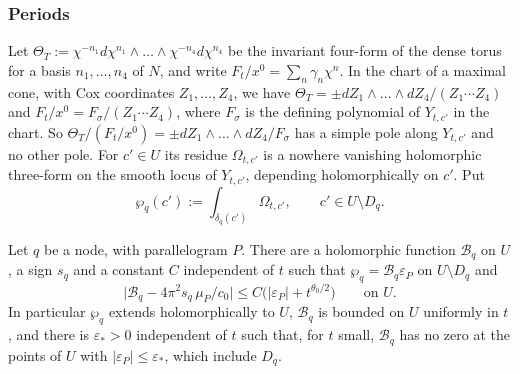 \subsubsection*{Periods}
Let $\Theta_T:=\chi^{-n_1}d\chi^{n_1}\wedge\dots\wedge\chi^{-n_4}d\chi^{n_4}$ be the invariant four-form of the dense
torus for a basis $n_1,\dots,n_4$ of $N$, and write $F_t/x^0=\sum_n\gamma_n\chi^n$. In the chart of a maximal cone, with
Cox coordinates $Z_1,\dots,Z_4$, we have $\Theta_T=\pm dZ_1\wedge\dots\wedge dZ_4/(Z_1\cdots Z_4)$ and
$F_t/x^0=F_\sigma/(Z_1\cdots Z_4)$, where $F_\sigma$ is the defining polynomial of $Y_{t,c'}$ in the chart. So
$\Theta_T/(F_t/x^0)=\pm dZ_1\wedge\dots\wedge dZ_4/F_\sigma$ has a simple pole along $Y_{t,c'}$ and no other pole. For
$c'\in U$ its residue $\Omega_{t,c'}$ is a nowhere vanishing holomorphic three-form on the smooth locus of $Y_{t,c'}$,
depending holomorphically on $c'$. Put
\[
\wp_q(c'):=\int_{\delta_q(c')}\Omega_{t,c'},\qquad c'\in U\setminus D_q .
\]

\begin{lemma}[periods]\label{lem:period}
Let $q$ be a node, with parallelogram $P$. There are a holomorphic function $\mathcal B_q$ on $U$, a sign $s_q$ and a
constant $C$ independent of $t$ such that $\wp_q=\mathcal B_q\varepsilon_P$ on $U\setminus D_q$ and
\[
\bigl|\mathcal B_q-4\pi^2s_q\,\mu_P/c_0\bigr|\le C\bigl(|\varepsilon_P|+t^{\theta_0/2}\bigr)\qquad\text{on }U.
\]
In particular $\wp_q$ extends holomorphically to $U$, $\mathcal B_q$ is bounded on $U$ uniformly in $t$, and there is
$\varepsilon_*>0$ independent of $t$ such that, for $t$ small, $\mathcal B_q$ has no zero at the points of $U$ with
$|\varepsilon_P|\le\varepsilon_*$, which include $D_q$.
\end{lemma}

